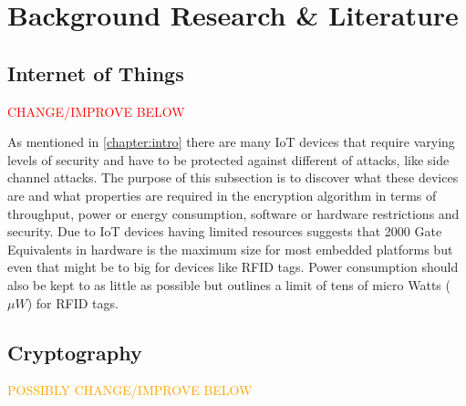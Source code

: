 \documentclass[12pt,twoside,a4paper]{report}
\begin{document}
    \chapter{Background Research \& Literature}
    \label{section:BACK}
    
    \section{Internet of Things}
    \label{section:IoT}
    
    \textcolor{red}{CHANGE/IMPROVE BELOW}
    
    As mentioned in \autoref{chapter:intro} there are many IoT devices that require varying levels of security and have to be protected against different of attacks, like side channel attacks. The purpose of this subsection is to discover what these devices are and what properties are required in the encryption algorithm in terms of throughput, power or energy consumption, software or hardware restrictions and security. Due to IoT devices having limited resources \cite{Juels2005} suggests that 2000 Gate Equivalents in hardware is the maximum size for most embedded platforms but even that might be to big for devices like RFID tags. Power consumption should also be kept to as little as possible but \cite{David2011} outlines a limit of tens of micro Watts ($\mu W$) for RFID tags.
    
    \section{Cryptography}
    \label{section:crypt}
    
    \textcolor{orange}{POSSIBLY CHANGE/IMPROVE BELOW}
    
\end{document}
